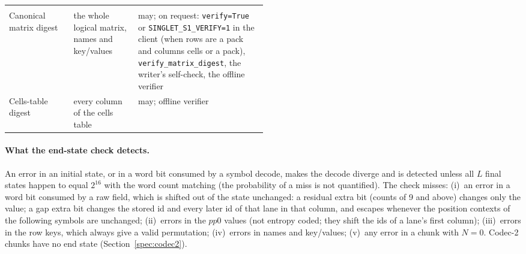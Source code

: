 \begin{table}[htbp]
\begin{tabularx}{\linewidth}{@{}>{\raggedright\arraybackslash}p{0.25\linewidth}>{\raggedright\arraybackslash}p{0.25\linewidth}X@{}}
\midrule
\multicolumn{3}{@{}l}{\emph{Logical integrity}} \\
Canonical matrix digest & the whole logical matrix, names and key/values & may; on request: \texttt{verify=True} or \texttt{SINGLET\_S1\_VERIFY=1} in the client (when rows are a pack and columns cells or a pack), \texttt{verify\_matrix\_digest}, the writer's self-check, the offline verifier \\
Cells-table digest & every column of the cells table & may; offline verifier \\
\bottomrule
\end{tabularx}
\end{table}

\paragraph{What the end-state check detects.}
An error in an initial state, or in a word bit consumed by a symbol decode, makes the decode diverge and is detected
unless all $L$ final states happen to equal $2^{16}$ with the word count matching (the probability of a miss is not
quantified). The check misses: (i)~an error in a word bit consumed by a raw field, which is shifted out of the
state unchanged: a residual extra bit (counts of 9 and above) changes only the value; a gap extra bit changes the stored
id and every later id of that lane in that column, and escapes whenever the position contexts of the following symbols
are unchanged; (ii)~errors in the $\mathit{pp0}$ values (not entropy coded; they shift the ids of a lane's first
column); (iii)~errors in the row keys, which always give a valid permutation; (iv)~errors in names and key/values;
(v)~any error in a chunk with $N=0$. Codec-2 chunks have no end state (Section~\ref{spec:codec2}).

